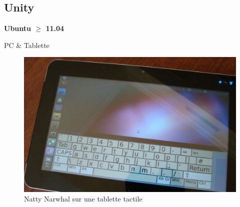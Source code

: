 \documentclass{beamer}
\begin{document}
\subsection*{Unity}
\begin{frame}

  \begin{center}
    {\bf Ubuntu $\geq$ 11.04 }
  \end{center}

  \begin{center}
    PC \& Tablette
  \end{center}

  \begin{figure}
    \includegraphics[width=0.7\linewidth]{images/tablette}
    \caption{Natty Narwhal sur une tablette tactile}
  \end{figure}
\end{frame}
\end{document}
